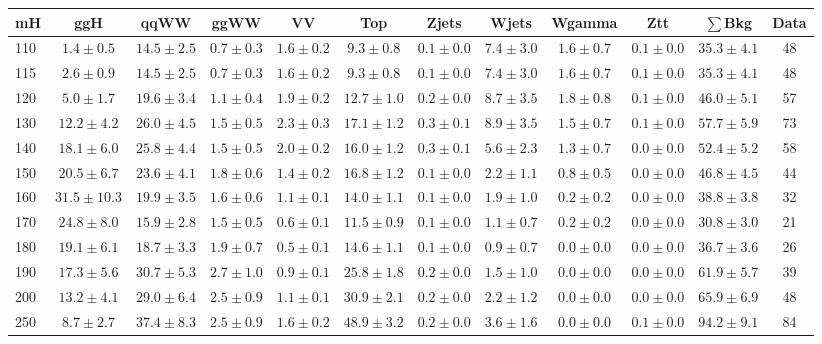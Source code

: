 \begin{table}[!ht]
{%
 \tiny
 \begin{center}
 \begin{tabular}{l c c c c c c c c c c c }
 \hline
 mH & ggH & qqWW & ggWW & VV & Top & Zjets & Wjets & Wgamma & Ztt & $\sum$Bkg & Data \\
 \hline
110 & $1.4\pm0.5$ & $14.5\pm2.5$ & $0.7\pm0.3$ & $1.6\pm0.2$ & $9.3\pm0.8$ & $0.1\pm0.0$ & $7.4\pm3.0$ & $1.6\pm0.7$ & $0.1\pm0.0$ & $35.3\pm4.1$ & 48 \\
115 & $2.6\pm0.9$ & $14.5\pm2.5$ & $0.7\pm0.3$ & $1.6\pm0.2$ & $9.3\pm0.8$ & $0.1\pm0.0$ & $7.4\pm3.0$ & $1.6\pm0.7$ & $0.1\pm0.0$ & $35.3\pm4.1$ & 48 \\
120 & $5.0\pm1.7$ & $19.6\pm3.4$ & $1.1\pm0.4$ & $1.9\pm0.2$ & $12.7\pm1.0$ & $0.2\pm0.0$ & $8.7\pm3.5$ & $1.8\pm0.8$ & $0.1\pm0.0$ & $46.0\pm5.1$ & 57 \\
130 & $12.2\pm4.2$ & $26.0\pm4.5$ & $1.5\pm0.5$ & $2.3\pm0.3$ & $17.1\pm1.2$ & $0.3\pm0.1$ & $8.9\pm3.5$ & $1.5\pm0.7$ & $0.1\pm0.0$ & $57.7\pm5.9$ & 73 \\
140 & $18.1\pm6.0$ & $25.8\pm4.4$ & $1.5\pm0.5$ & $2.0\pm0.2$ & $16.0\pm1.2$ & $0.3\pm0.1$ & $5.6\pm2.3$ & $1.3\pm0.7$ & $0.0\pm0.0$ & $52.4\pm5.2$ & 58 \\
150 & $20.5\pm6.7$ & $23.6\pm4.1$ & $1.8\pm0.6$ & $1.4\pm0.2$ & $16.8\pm1.2$ & $0.1\pm0.0$ & $2.2\pm1.1$ & $0.8\pm0.5$ & $0.0\pm0.0$ & $46.8\pm4.5$ & 44 \\
160 & $31.5\pm10.3$ & $19.9\pm3.5$ & $1.6\pm0.6$ & $1.1\pm0.1$ & $14.0\pm1.1$ & $0.1\pm0.0$ & $1.9\pm1.0$ & $0.2\pm0.2$ & $0.0\pm0.0$ & $38.8\pm3.8$ & 32 \\
170 & $24.8\pm8.0$ & $15.9\pm2.8$ & $1.5\pm0.5$ & $0.6\pm0.1$ & $11.5\pm0.9$ & $0.1\pm0.0$ & $1.1\pm0.7$ & $0.2\pm0.2$ & $0.0\pm0.0$ & $30.8\pm3.0$ & 21 \\
180 & $19.1\pm6.1$ & $18.7\pm3.3$ & $1.9\pm0.7$ & $0.5\pm0.1$ & $14.6\pm1.1$ & $0.1\pm0.0$ & $0.9\pm0.7$ & $0.0\pm0.0$ & $0.0\pm0.0$ & $36.7\pm3.6$ & 26 \\
190 & $17.3\pm5.6$ & $30.7\pm5.3$ & $2.7\pm1.0$ & $0.9\pm0.1$ & $25.8\pm1.8$ & $0.2\pm0.0$ & $1.5\pm1.0$ & $0.0\pm0.0$ & $0.0\pm0.0$ & $61.9\pm5.7$ & 39 \\
200 & $13.2\pm4.1$ & $29.0\pm6.4$ & $2.5\pm0.9$ & $1.1\pm0.1$ & $30.9\pm2.1$ & $0.2\pm0.0$ & $2.2\pm1.2$ & $0.0\pm0.0$ & $0.0\pm0.0$ & $65.9\pm6.9$ & 48 \\
250 & $8.7\pm2.7$ & $37.4\pm8.3$ & $2.5\pm0.9$ & $1.6\pm0.2$ & $48.9\pm3.2$ & $0.2\pm0.0$ & $3.6\pm1.6$ & $0.0\pm0.0$ & $0.1\pm0.0$ & $94.2\pm9.1$ & 84 \\

\end{tabular}
\end{center}}
\end{table}
